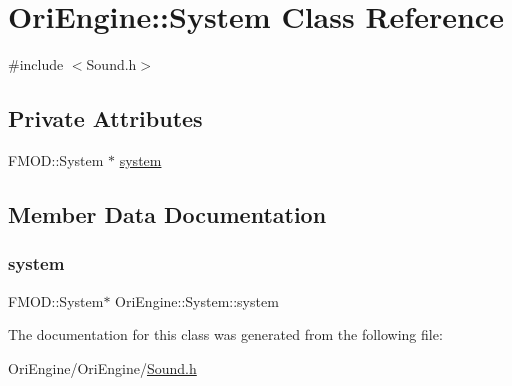 \hypertarget{class_ori_engine_1_1_system}{}\section{Ori\+Engine\+:\+:System Class Reference}
\label{class_ori_engine_1_1_system}


{\ttfamily \#include $<$Sound.\+h$>$}

\subsection*{Private Attributes}
\begin{DoxyCompactItemize}
\item 
F\+M\+O\+D\+::\+System $\ast$ \hyperlink{class_ori_engine_1_1_system_a1b2c7b3a05848016f765c4342ec27a45}{system}
\end{DoxyCompactItemize}


\subsection{Member Data Documentation}
\hypertarget{class_ori_engine_1_1_system_a1b2c7b3a05848016f765c4342ec27a45}{}\label{class_ori_engine_1_1_system_a1b2c7b3a05848016f765c4342ec27a45} 
\subsubsection{\texorpdfstring{system}{system}}
{\footnotesize\ttfamily F\+M\+O\+D\+::\+System$\ast$ Ori\+Engine\+::\+System\+::system\hspace{0.3cm}{\ttfamily [private]}}



The documentation for this class was generated from the following file\+:\begin{DoxyCompactItemize}
\item 
Ori\+Engine/\+Ori\+Engine/\hyperlink{_sound_8h}{Sound.\+h}\end{DoxyCompactItemize}
